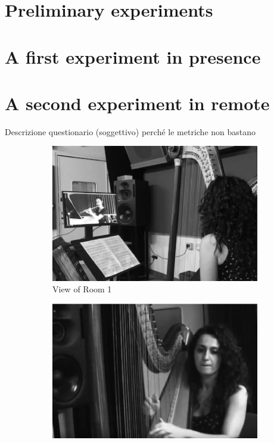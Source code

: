 \section{Preliminary experiments}
\section{A first experiment in presence}
\section{A second experiment in remote}
Descrizione questionario (soggettivo) perché le metriche non bastano






\begin{figure}[t]
	\centering
    \begin{subfigure}[t]{\columnwidth}
		\centering        
		\includegraphics[width=\textwidth]{img/as.eps}
		\caption{View of Room 1}
		\label{subfig:as}
	\end{subfigure}
    \begin{subfigure}[t]{\columnwidth}
	\centering        
	\includegraphics[width=\textwidth]{img/av.eps}

\end{subfigure}
\end{figure}
